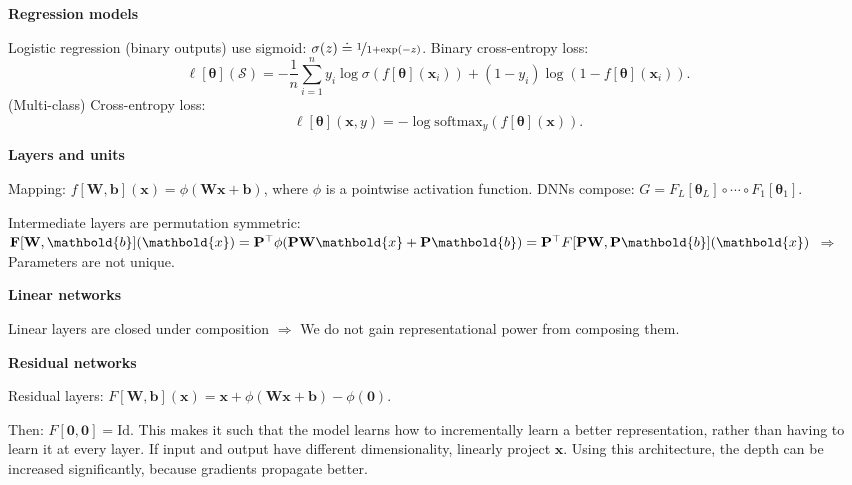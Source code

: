 \documentclass[10pt]{article}
\newenvironment{topic}[1]
{\textbf{\sffamily \footnotesize \colorbox{black}{\rlap{\textbf{\textcolor{white}{#1}}}\hspace{\linewidth}\hspace{-2\fboxsep}}}}
{}
\newenvironment{subtopic}[1]
{\begin{center}\textbf{\footnotesize \sffamily #1}\end{center}}
{}
\renewcommand{\mat}[1]{\ensuremath{\mathbf{#1}}}
\renewcommand{\vec}[1]{\ensuremath{\mathbold{#1}}}
\begin{document}
\begin{multicols*}{3}
\begin{topic}{Feedforward networks}
\begin{subtopic}{Regression models}
            Logistic regression (binary outputs) use sigmoid: $\sigma(z) \doteq \nicefrac{1}{1 + \exp(-z)}$.
            Binary cross-entropy loss: \[
                \ell[\vec{\theta}](\mathcal{S}) = -\frac{1}{n} \sum_{i=1}^{n} y_i \log \sigma(f[\vec{\theta}](\vec{x}_i)) + (1-y_i)\log(1-f[\vec{\theta}](\vec{x}_i)).
            \] (Multi-class) Cross-entropy loss: \[
                \ell[\vec{\theta}](\vec{x},y) = -\log \mathrm{softmax}_y(f[\vec{\theta}](\vec{x})).
            \]
        \end{subtopic}

        \begin{subtopic}{Layers and units}
            Mapping: $f[\mat{W},\vec{b}](\vec{x}) = \phi(\mat{W}\vec{x}+\vec{b})$, where $\phi$ is a pointwise activation function. DNNs compose: $G = F_L[\vec{\theta}_L] \circ \cdots \circ F_1[\vec{\theta}_1]$.

            Intermediate layers are permutation symmetric: $\mat{F}[\mat{W},\vec{b}](\vec{x}) = \transpose{\mat{P}}
                \phi(\mat{P}\mat{W}\vec{x} + \mat{P}\vec{b}) = \transpose{\mat{P}} F[\mat{P} \mat{W},
                        \mat{P}\vec{b}](\vec{x})$ $\Rightarrow$ Parameters are not unique.
        \end{subtopic}

        \begin{subtopic}{Linear networks}
            Linear layers are closed under composition $\Rightarrow$ We do not gain representational power from composing them.
        \end{subtopic}

        \begin{subtopic}{Residual networks}
            Residual layers: $F[\mat{W},\vec{b}](\vec{x}) = \vec{x} + \phi(\mat{W}\vec{x} + \vec{b}) - \phi(\vec{0})$.

            Then: $F[\vec{0}, \vec{0}] = \mathrm{Id}$. This makes it such that the model learns how to
            incrementally learn a better representation, rather than having to learn it at every layer. If
            input and output have different dimensionality, linearly project $\vec{x}$. Using this
            architecture, the depth can be increased significantly, because gradients propagate better.
        \end{subtopic}


\end{topic}
\end{multicols*}
\end{document}
